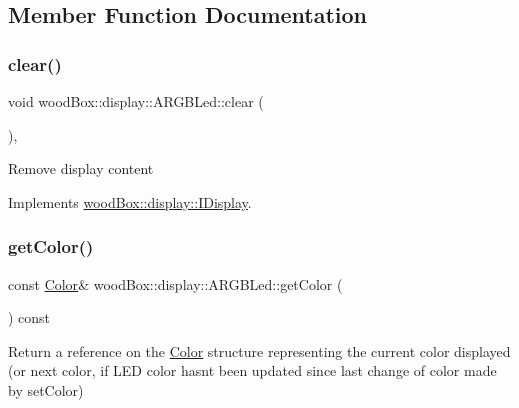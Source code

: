\subsection{Member Function Documentation}
\mbox{\label{classwood_box_1_1display_1_1_a_r_g_b_led_a6639eef02bb6b70988d85c006f73eb72}} 
\subsubsection{\texorpdfstring{clear()}{clear()}}
{\footnotesize\ttfamily void wood\+Box\+::display\+::\+A\+R\+G\+B\+Led\+::clear (\begin{DoxyParamCaption}{ }\end{DoxyParamCaption})\hspace{0.3cm}{\ttfamily [inline]}, {\ttfamily [virtual]}}

Remove display content 

Implements \mbox{\hyperlink{classwood_box_1_1display_1_1_i_display_a7030f0768c1ef15ce936a259406168dc}{wood\+Box\+::display\+::\+I\+Display}}.

\mbox{\label{classwood_box_1_1display_1_1_a_r_g_b_led_ae0bd01eab303006612eb46058824b0c1}} 
\subsubsection{\texorpdfstring{get\+Color()}{getColor()}}
{\footnotesize\ttfamily const \mbox{\hyperlink{structwood_box_1_1display_1_1_a_r_g_b_led_1_1_color}{Color}}\& wood\+Box\+::display\+::\+A\+R\+G\+B\+Led\+::get\+Color (\begin{DoxyParamCaption}{ }\end{DoxyParamCaption}) const\hspace{0.3cm}{\ttfamily [inline]}}

Return a reference on the \mbox{\hyperlink{structwood_box_1_1display_1_1_a_r_g_b_led_1_1_color}{Color}} structure representing the current color displayed (or next color, if L\+ED color hasn\textquotesingle{}t been updated since last change of color made by set\+Color)

